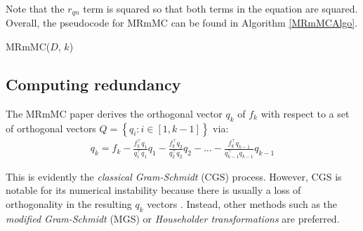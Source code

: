 \documentclass[12pt, twoside, a4paper]{report}
\begin{document}
Note that the $r_{qn}$ term is squared so that both terms in the equation are squared. Overall, the pseudocode for MRmMC can be found in Algorithm \ref{MRmMCAlgo}.

\begin{algorithm}
\DontPrintSemicolon
{}
\BlankLine
{}
\caption{MRmMC($D$, $k$) \label{MRmMCAlgo}}
\end{algorithm}

\subsection{Computing redundancy} \label{mrmmc:redundancy:computation}

The MRmMC paper \cite{RefWorks:187} derives the orthogonal vector $q_k$ of $f_k$ with respect to a set of orthogonal vectors $Q = \left\lbrace q_i: i \in [1, k-1] \right\rbrace$ via:
\begin{align*}
q_k = f_k  - \frac{f_k^\top q_1}{q_1^\top q_1}q_1  - \frac{f_k^\top q_2}{q_2^\top q_2}q_2 - \dots - \frac{f_k^\top q_{k-1}}{q_{k-1}^\top q_{k-1}}q_{k-1}
\end{align*}

This is evidently the \textit{classical Gram-Schmidt} (CGS) process. However, CGS is notable for its numerical instability because there is usually a loss of orthogonality in the resulting $q_k$ vectors \cite{RefWorks:195}. Instead, other methods such as the \textit{modified Gram-Schmidt} (MGS) or \textit{Householder transformations} are preferred.

\end{document}
